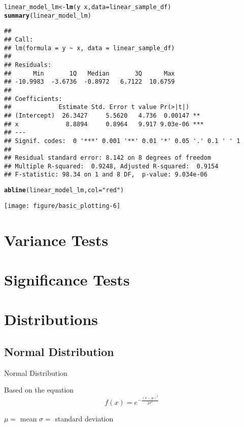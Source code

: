 \documentclass[a4paper,10pt]{book}\usepackage[]{graphicx}\usepackage[]{color}
\makeatletter
\def\maxwidth{ %
  \ifdim\Gin@nat@width>\linewidth
    \linewidth
  \else
    \Gin@nat@width
  \fi
}
\newcommand{\hlstr}[1]{\textcolor[rgb]{0.192,0.494,0.8}{#1}}%
\newcommand{\hlopt}[1]{\textcolor[rgb]{0,0,0}{#1}}%
\newcommand{\hlstd}[1]{\textcolor[rgb]{0.345,0.345,0.345}{#1}}%
\newcommand{\hlkwb}[1]{\textcolor[rgb]{0.69,0.353,0.396}{#1}}%
\newcommand{\hlkwc}[1]{\textcolor[rgb]{0.333,0.667,0.333}{#1}}%
\newcommand{\hlkwd}[1]{\textcolor[rgb]{0.737,0.353,0.396}{\textbf{#1}}}%
\newenvironment{kframe}{%
 \def\at@end@of@kframe{}%
 \ifinner\ifhmode%
  \def\at@end@of@kframe{\end{minipage}}%
  \begin{minipage}{\columnwidth}%
 \fi\fi%
 \def\FrameCommand##1{\hskip\@totalleftmargin \hskip-\fboxsep
 \colorbox{shadecolor}{##1}\hskip-\fboxsep
     \hskip-\linewidth \hskip-\@totalleftmargin \hskip\columnwidth}%
 \MakeFramed {\advance\hsize-\width
   \@totalleftmargin\z@ \linewidth\hsize
   \@setminipage}}%
 {\par\unskip\endMakeFramed%
 \at@end@of@kframe}
\newenvironment{knitrout}{}{} %
\makeatother
\begin{document}
\begin{knitrout}
\begin{kframe}
\begin{alltt}
\hlstd{linear_model_lm} \hlkwb{<-} \hlkwd{lm}\hlstd{(y} \hlopt{~} \hlstd{x,} \hlkwc{data}\hlstd{=linear_sample_df)}
\hlkwd{summary}\hlstd{(linear_model_lm)}
\end{alltt}
\begin{verbatim}
## 
## Call:
## lm(formula = y ~ x, data = linear_sample_df)
## 
## Residuals:
##      Min       1Q   Median       3Q      Max 
## -10.9983  -3.6736  -0.8972   6.7122  10.6759 
## 
## Coefficients:
##             Estimate Std. Error t value Pr(>|t|)    
## (Intercept)  26.3427     5.5620   4.736  0.00147 ** 
## x             8.8894     0.8964   9.917 9.03e-06 ***
## ---
## Signif. codes:  0 '***' 0.001 '**' 0.01 '*' 0.05 '.' 0.1 ' ' 1
## 
## Residual standard error: 8.142 on 8 degrees of freedom
## Multiple R-squared:  0.9248,	Adjusted R-squared:  0.9154 
## F-statistic: 98.34 on 1 and 8 DF,  p-value: 9.034e-06
\end{verbatim}
\begin{alltt}
\hlkwd{abline}\hlstd{(linear_model_lm,} \hlkwc{col}\hlstd{=}\hlstr{"red"}\hlstd{)}
\end{alltt}
\end{kframe}
\texttt{[image: figure/basic\_plotting-6]} 

\end{knitrout}


\section*{Variance Tests}




\section*{Significance Tests}




\section*{Distributions}




\subsection*{Normal Distribution}

Normal Distribution 

Based on the equation $$ f(x) = e^{-\frac{(x-\mu)^2}{2\sigma^2}} $$

$\mu = $ mean
$\sigma = $ standard deviation
\end{document}
